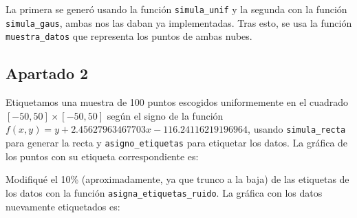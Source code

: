 \documentclass{article}
\begin{document}
La primera se generó usando la función \texttt{simula\_unif} y la segunda con la función \texttt{simula\_gaus}, ambas nos las daban ya implementadas. Tras esto, se usa la función \texttt{muestra\_datos} que representa los puntos de ambas nubes.

\subsection{Apartado 2}

Etiquetamos una muestra de 100 puntos escogidos uniformemente en el cuadrado $[-50, 50] \times [-50, 50]$ según el signo de la función $f(x,y) = y + 2.45627963467703x - 116.24116219196964$, usando \texttt{simula\_recta} para generar la recta y \texttt{asigno\_etiquetas} para etiquetar los datos. La gráfica de los puntos con su etiqueta correspondiente es:

\begin{figure}[H]
  \centering
\end{figure}

Modifiqué el 10\% (aproximadamente, ya que trunco a la baja) de las etiquetas de los datos con la función \texttt{asigna\_etiquetas\_ruido}. La gráfica con los datos nuevamente etiquetados es:

\begin{figure}[H]
  \centering
\end{figure}
\end{document}

